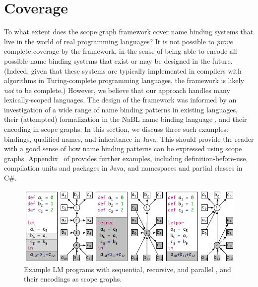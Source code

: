 \section{Coverage}

To what extent does the scope graph framework cover name binding systems that live in the
world of real programming languages? It is not possible to \emph{prove} complete
coverage by the framework, in the sense of being able to encode all possible
name binding systems that exist or may be designed in the future.
(Indeed, given that these systems are typically implemented in compilers
with algorithms in Turing-complete programming languages, the framework is likely
\emph{not} to be complete.)
However, we believe that our approach handles many lexically-scoped languages.
The design of the framework was informed by an investigation of a wide range of
name binding patterns in existing languages, their (attempted) formalization in
the NaBL name binding language \cite{KatsV10,KonatKWV12}, and their encoding in scope
graphs.
In this section, we discuss three such examples:  bindings, qualified names,
and inheritance in Java.
This should provide the reader with a good sense of how name binding patterns
can be expressed using scope graphs.
Appendix  ~of \cite{TUD-SERG-2015-001-local} provides further examples,
including definition-before-use, compilation units and packages in Java, and namespaces and partial classes in
C\#. 

\begin{figure}[t]
\begin{boxedminipage}{\hsize}
\centering\includegraphics{figures/scope-graphs/lets/all.pdf}
\end{boxedminipage}
\vspace*{-\baselineskip}
\caption{Example LM programs with sequential, recursive, and parallel , and
their encodings as scope graphs.}
\end{figure}

